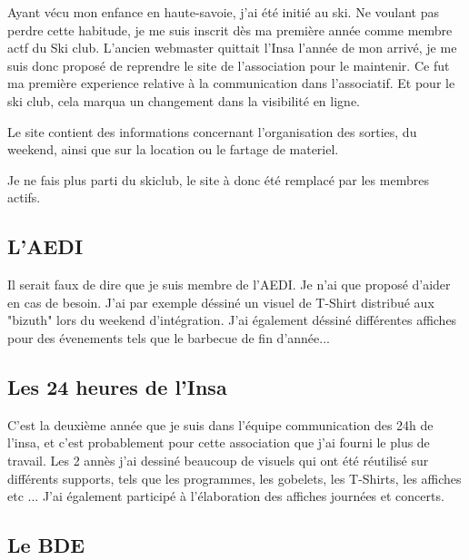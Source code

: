         Ayant vécu mon enfance en haute-savoie, j'ai été initié au ski. Ne voulant pas perdre cette habitude, je me suis inscrit dès ma première année comme membre actf du Ski club.
        L'ancien webmaster quittait l'Insa l'année de mon arrivé, je me suis donc proposé de reprendre le site de l'association pour le maintenir.
        Ce fut ma première experience relative à la communication dans l'associatif.
        Et pour le ski club, cela marqua un changement dans la visibilité en ligne.
        
        Le site contient des informations concernant l'organisation des sorties, du weekend, ainsi que sur la location ou le fartage de materiel.
        
        
        Je ne fais plus parti du skiclub, le site à donc été remplacé par les membres actifs.
        
        
    \subsection{L'AEDI}
        
        Il serait faux de dire que je suis membre de l'AEDI. Je n'ai que proposé d'aider en cas de besoin.
        J'ai par exemple déssiné un visuel de T-Shirt distribué aux "bizuth" lors du weekend d'intégration.
        J'ai également déssiné différentes affiches pour des évenements tels que le barbecue de fin d'année...
        
        
    \subsection{Les 24 heures de l'Insa}
        
        C'est la deuxième année que je suis dans l'équipe communication des 24h de l'insa, et c'est probablement pour cette association que j'ai fourni le plus de travail.
        Les 2 annès j'ai dessiné beaucoup de visuels qui ont été réutilisé sur différents supports, tels que les programmes, les gobelets, les T-Shirts, les affiches etc ...
        J'ai également participé à l'élaboration des affiches journées et concerts.
        
        
    \subsection{Le BDE}
    
